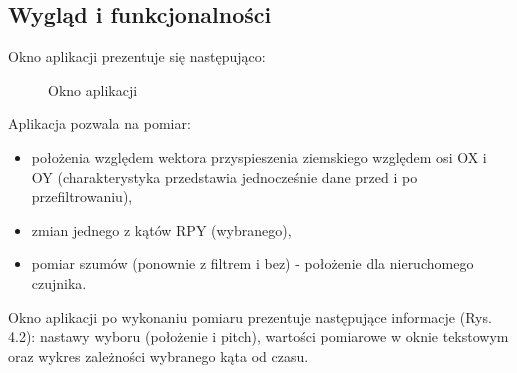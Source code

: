 \subsection{Wygląd i funkcjonalności}

Okno aplikacji prezentuje się następująco:

\begin{figure}[H]
    \hfill
    \caption{Okno aplikacji}
    \label{fig:app}
\end{figure}

Aplikacja pozwala na pomiar:

\begin{itemize}
    \item położenia względem wektora przyspieszenia ziemskiego względem osi OX i OY (charakterystyka przedstawia jednocześnie dane przed i po przefiltrowaniu),
    \item zmian jednego z kątów RPY (wybranego),
    \item pomiar szumów (ponownie z filtrem i bez) - położenie dla nieruchomego czujnika.
\end{itemize}

Okno aplikacji po wykonaniu pomiaru prezentuje następujące informacje (Rys. 4.2): nastawy wyboru (położenie i pitch), wartości pomiarowe w oknie tekstowym oraz wykres zależności wybranego kąta od czasu.

